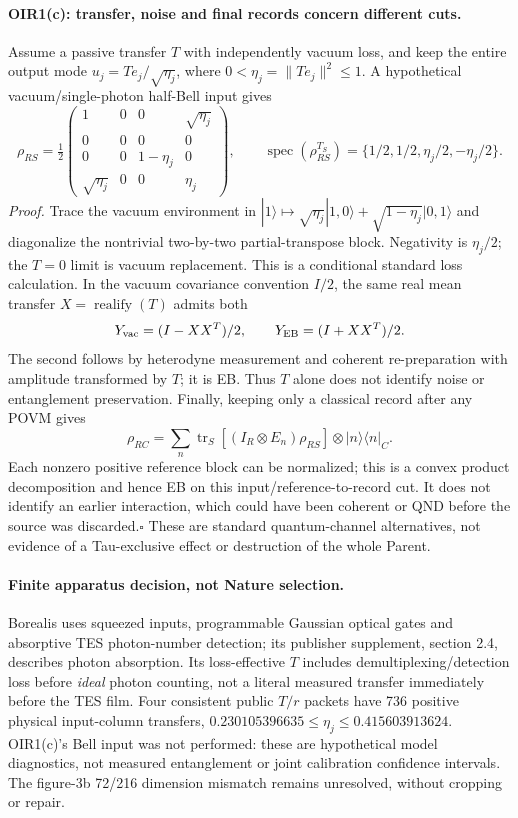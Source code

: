 \documentclass[11pt]{article}
\begin{document}
\paragraph{OIR1(c): transfer, noise and final records concern different cuts.}
Assume a passive transfer $T$ with independently vacuum loss, and keep the
entire output mode $u_j=Te_j/\sqrt{\eta_j}$, where
$0<\eta_j=\|Te_j\|^2\leq1$. A hypothetical vacuum/single-photon half-Bell
input gives
\[
 \rho_{RS}=\tfrac12\begin{pmatrix}
 1&0&0&\sqrt{\eta_j}\\0&0&0&0\\
 0&0&1-\eta_j&0\\\sqrt{\eta_j}&0&0&\eta_j
 \end{pmatrix},\qquad
 \operatorname{spec}(\rho_{RS}^{T_S})
 =\{1/2,1/2,\eta_j/2,-\eta_j/2\}.                         \tag{OIR1c}
\]
\emph{Proof.} Trace the vacuum environment in
$|1\rangle\mapsto\sqrt{\eta_j}|1,0\rangle+
\sqrt{1-\eta_j}|0,1\rangle$ and diagonalize the nontrivial two-by-two
partial-transpose block. Negativity is $\eta_j/2$; the $T=0$ limit is
vacuum replacement. This is a conditional standard loss calculation.
In the vacuum covariance convention $I/2$, the same real mean transfer
$X=\operatorname{realify}(T)$ admits both
\[
 Y_{\rm vac}=(I-XX^T)/2,\qquad Y_{\rm EB}=(I+XX^T)/2.
\]
The second follows by heterodyne measurement and coherent re-preparation
with amplitude transformed by $T$; it is EB. Thus $T$ alone does not
identify noise or entanglement preservation.
Finally, keeping only a classical record after any POVM gives
\[
 \rho_{RC}=\sum_n\operatorname{tr}_S[(I_R\otimes E_n)\rho_{RS}]
                 \otimes|n\rangle\langle n|_C.
\]
Each nonzero positive reference block can be normalized; this is a convex
product decomposition and hence EB on this input/reference-to-record cut.
It does not identify an earlier interaction, which could have been coherent
or QND before the source was discarded.\hfill$\square$
These are standard quantum-channel alternatives\cite{Horodecki2003EB}, not
evidence of a Tau-exclusive effect or destruction of the whole Parent.

\paragraph{Finite apparatus decision, not Nature selection.}
Borealis uses squeezed inputs, programmable Gaussian optical gates and
absorptive TES photon-number detection\cite{Madsen2022Borealis}; its
publisher supplement, section 2.4, describes photon absorption.
Its loss-effective $T$ includes
demultiplexing/detection loss before \emph{ideal} photon counting, not a
literal measured transfer immediately before the TES film. Four consistent
public $T/r$ packets have 736 positive physical input-column transfers,
$0.230105396635\leq\eta_j\leq0.415603913624$. OIR1(c)'s Bell input
was not performed: these are hypothetical model diagnostics, not measured
entanglement or joint calibration confidence intervals. The figure-3b
72/216 dimension mismatch remains unresolved, without cropping or repair.
\end{document}
